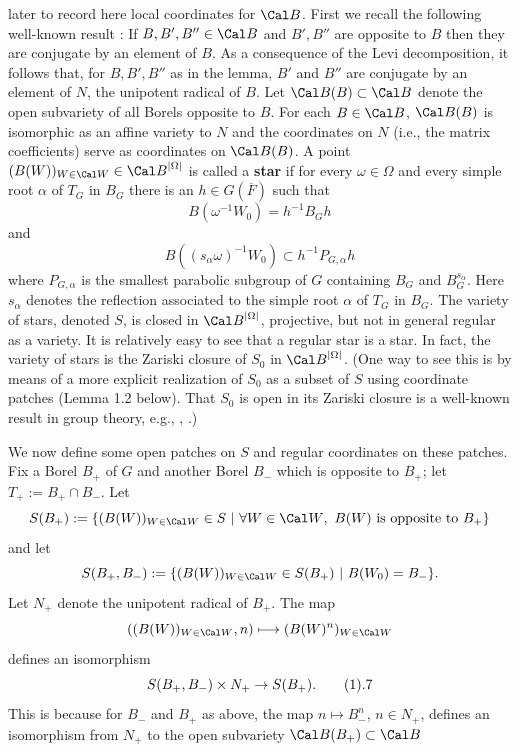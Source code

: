 later to record here local coordinates for ${\Cal B}$.
First we recall the following 
well-known result \cite{Bor, ch IV, Corollary 14.13}:
 If $B,B',B''\in {\Cal B}$ and $B', B''$ are opposite
to $B$ then they are conjugate by an element of $B$.
\endproclaim
 As a consequence of the Levi decomposition, 
it follows that, for $B, B',B''$ as in the lemma,
$B'$ and $B''$ are conjugate by an element of $N$, the unipotent radical of 
$B$. Let ${\Cal B}(B)\subset {\Cal B}$
denote the open subvariety of all Borels
opposite to $B$.
 For each $B\in {\Cal B}$, ${\Cal B}(B)$
is isomorphic
as an affine variety to $N$ and the coordinates on $N$ (i.e., the matrix
coefficients) serve as coordinates on ${\Cal B}(B)$.
\endproclaim
A point
$(B(W))_{W\in{\Cal W}}\in {\Cal B}^{|\Omega|}$ is called a {\bf star}
if for every $\omega\in\Omega$ and every simple root $\alpha$
of $T_G$ in $B_G$ there is an $h\in G(\overline{F})$
such that
$$
B(\omega^{-1}W_0)=h^{-1}B_Gh
$$
and
$$
B((s_\alpha\omega)^{-1}W_0)\subset h^{-1}P_{G,\alpha} h
$$
where ${P}_{G,\alpha}$ is the smallest parabolic subgroup 
of $G$ containing $B_G$ and $B_G^{s_\alpha}$.
Here $s_\alpha$ denotes the reflection associated to
the simple root $\alpha$ of $T_G$ in $B_G$. The variety of stars,
denoted $S$, is closed in ${\Cal B}^{|\Omega |}$, projective,
but not in general regular as a variety.
It is relatively easy to see that a regular star is a star.
In fact, the variety of stars is the Zariski closure of $S_0$
in ${\Cal B}^{|\Omega|}$. (One way to see this is by means of
a more explicit realization of $S_0$ as a subset of $S$ using
coordinate patches (Lemma 1.2 below). That $S_0$ is 
open in its Zariski closure is a
well-known result in group theory, e.g.,
\cite{Sp3, ch.4, Lemma 4.3.1}, \cite{Bor, II.6, Prop. 6.7}.)
\par
We now define some open patches on $S$ and regular
coordinates on these patches.
Fix a Borel $B_+$ of $G$ and another Borel $B_-$ which is 
opposite to $B_+$; let $T_+:=B_+\cap B_-$. Let
$$
S(B_+):=\{(B(W))_{W\in{\Cal W}}\in S\ |\ \forall W\in{\Cal W},\ 
B(W) \text{ is opposite to }B_+\}
$$
and let
$$
S(B_+,B_-):=\{(B(W))_{W\in{\Cal W}}\in S(B_+)\ 
|\ B(W_0)=B_-\}.
$$
Let $N_+$ denote the unipotent radical of $B_+$. The map
$$
((B(W))_{W\in{\Cal W}},n)\longmapsto (B(W)^n)_{W\in{\Cal W}}
$$
defines an isomorphism
$$
S(B_+,B_-)\times N_+ \rightarrow S(B_+).
\tag 1.7
$$
This is because for $B_-$ and $B_+$ as above, the map
$n\longmapsto B_-^n$, $n\in N_+$, defines an isomorphism from
$N_+$ to the open subvariety ${\Cal B}(B_+)\subset {\Cal B}$
